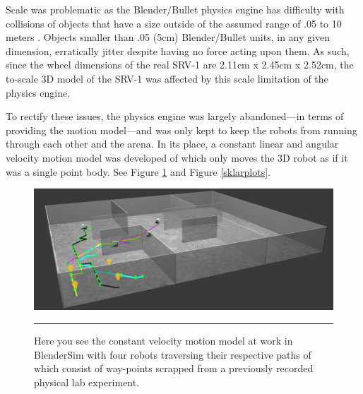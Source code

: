 Scale was problematic as the Blender/Bullet physics engine has difficulty with collisions of objects that have a size outside of the assumed range of .05 to 10 meters \cite{website:bulletscale}. Objects smaller than .05 (5cm) Blender/Bullet units, in any given dimension, erratically jitter despite having no force acting upon them. 
As such, since the wheel dimensions of the real SRV-1 are 2.11cm x 2.45cm x 2.52cm, the to-scale 3D model of the SRV-1 was affected by this scale limitation of the physics engine.

To rectify these issues, the physics engine was largely abandoned---in terms of providing the motion model---and was only kept to keep the robots from running through each other and the arena. In its place, a constant linear and angular velocity motion model was developed of which only moves the 3D robot as if it was a single point body. See Figure \ref{blendersimrun} and Figure \ref{sklarplots}. 

\begin{figure}[htbp]
\centering
\includegraphics[scale=0.28]{../Figures/Chapter5/const_motion_model.png}
\rule{35em}{0.5pt}
\caption[Constant Velocity Locomotion Model]{Here you see the constant velocity motion model at work in BlenderSim with four robots traversing their respective paths of which consist of way-points scrapped from a previously recorded physical lab experiment.}
\label{blendersimrun}
\end{figure}

